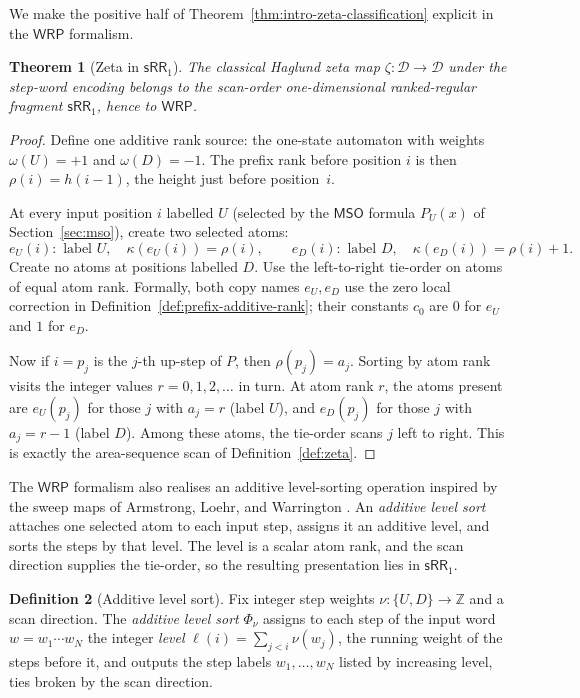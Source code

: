\documentclass[11pt]{article}
\newtheorem{theorem}{Theorem}[section]
\theoremstyle{definition}
\newtheorem{definition}[theorem]{Definition}
\newcommand{\D}{\mathcal D}
\newcommand{\Z}{\mathbb Z}
\newcommand{\WRP}{\mathsf{WRP}}
\newcommand{\SWR}{\mathsf{sRR}_1}
\newcommand{\MSO}{\mathsf{MSO}}
\begin{document}
We make the positive half of Theorem~\ref{thm:intro-zeta-classification}
explicit in the $\WRP$ formalism.

\begin{theorem}[Zeta in $\SWR$]\label{thm:zeta-wrp}
The classical Haglund zeta map $\zeta\colon\D\to\D$ under the step-word
encoding belongs to the scan-order one-dimensional ranked-regular fragment
$\SWR$, hence to $\WRP$.
\end{theorem}

\begin{proof}
Define one additive rank source: the one-state automaton with weights
$\omega(U)=+1$ and $\omega(D)=-1$.  The prefix rank before position $i$
is then $\rho(i)=h(i-1)$, the height just before position~$i$.

At every input position $i$ labelled $U$ (selected by the $\MSO$ formula
$P_U(x)$ of Section~\ref{sec:mso}), create two selected atoms:
\[
   e_U(i)\colon\text{ label }U,\quad \kappa(e_U(i))=\rho(i),
   \qquad
   e_D(i)\colon\text{ label }D,\quad \kappa(e_D(i))=\rho(i)+1.
\]
Create no atoms at positions labelled $D$.  Use the left-to-right tie-order
on atoms of equal atom rank.  Formally, both copy names $e_U,e_D$ use the zero local
correction in Definition~\ref{def:prefix-additive-rank}; their constants $c_0$
are $0$ for $e_U$ and $1$ for $e_D$.

Now if $i=p_j$ is the $j$-th up-step of $P$, then $\rho(p_j)=a_j$.  Sorting
by atom rank visits the integer values $r=0,1,2,\ldots$ in turn.  At atom rank
$r$, the atoms
present are $e_U(p_j)$ for those $j$ with $a_j=r$ (label $U$), and
$e_D(p_j)$ for those $j$ with $a_j=r-1$ (label $D$).  Among these atoms, the
tie-order scans $j$ left to right.  This is exactly the area-sequence scan
of Definition~\ref{def:zeta}.
\end{proof}

The $\WRP$ formalism also realises an additive level-sorting operation inspired
by the sweep maps of Armstrong, Loehr, and Warrington
\cite{ArmstrongLoehrWarrington2015,ArmstrongLoehrWarrington2016}.  An
\emph{additive level sort} attaches one selected atom to each input step, assigns
it an additive level, and sorts the steps by that level.  The level is a scalar
atom rank, and the scan direction supplies the tie-order, so the resulting
presentation lies in $\SWR$.

\begin{definition}[Additive level sort]\label{def:additive-sweep}
Fix integer step weights $\nu\colon\{U,D\}\to\Z$ and a scan direction.  The
\emph{additive level sort} $\Phi_\nu$ assigns to each step of the input
word $w=w_1\cdots w_N$ the integer \emph{level} $\ell(i)=\sum_{j<i}\nu(w_j)$,
the running weight of the steps before it, and outputs the step labels
$w_1,\ldots,w_N$ listed by increasing level, ties broken by the scan
direction.
\end{definition}
\end{document}
